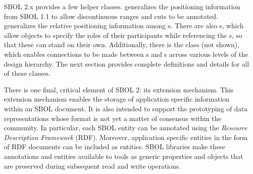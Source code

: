SBOL 2.x provides a few helper classes.   generalizes the positioning information from SBOL 1.1 to allow discontinuous ranges and cuts to be annotated.   generalizes the relative positioning information among s.  
There are also s, which allow  objects to specify the roles of their participants while referencing the s, so that these can stand on their own.
Additionally, there is the  class (not shown), which enables connections to be made between s and s across various levels of the design hierarchy.  The next section provides complete definitions and details for all of these classes.

There is one final, critical element of SBOL 2: its extension mechanism. This extension mechanism enables the storage of application specific information within an SBOL document. It is also intended to support the prototyping of data representations whose format is not yet a matter of consensus within the community. In particular, each SBOL entity can be annotated using the \emph{Resource Description Framework} (RDF). Moreover, application specific entities in the form of RDF documents can be included as  entities. SBOL libraries make these annotations and entities available to tools as generic properties and objects that are preserved during subsequent read and write operations.
